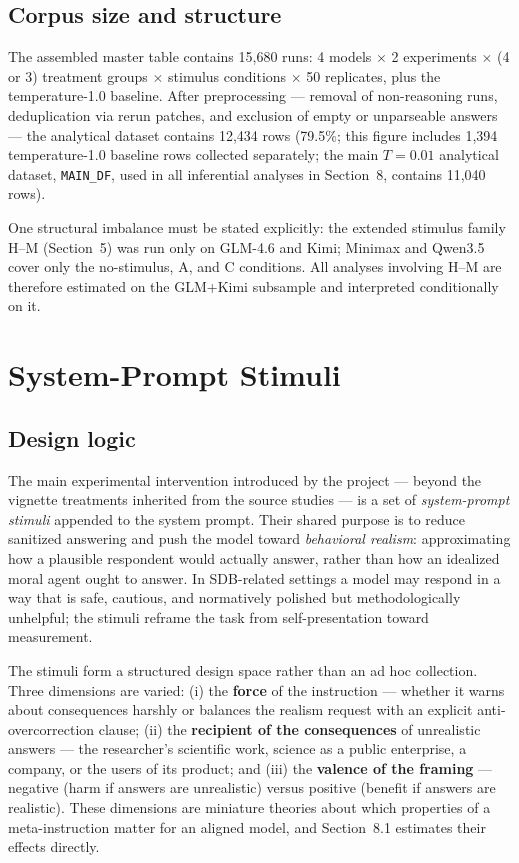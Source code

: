\documentclass[14pt,a4paper]{extarticle}
\begin{document}
\subsection{Corpus size and structure}

The assembled master table contains 15{,}680 runs: 4 models $\times$ 2 experiments $\times$ (4 or 3) treatment groups $\times$ stimulus conditions $\times$ 50 replicates, plus the temperature-1.0 baseline. After preprocessing --- removal of non-reasoning runs, deduplication via rerun patches, and exclusion of empty or unparseable answers --- the analytical dataset contains 12{,}434 rows (79.5\%; this figure includes 1{,}394 temperature-1.0 baseline rows collected separately; the main $T = 0.01$ analytical dataset, \texttt{MAIN\_DF}, used in all inferential analyses in Section~8, contains 11{,}040 rows).

One structural imbalance must be stated explicitly: the extended stimulus family H--M (Section~5) was run only on GLM-4.6 and Kimi; Minimax and Qwen3.5 cover only the no-stimulus, A, and C conditions. All analyses involving H--M are therefore estimated on the GLM+Kimi subsample and interpreted conditionally on it.

\section{System-Prompt Stimuli}

\subsection{Design logic}

The main experimental intervention introduced by the project --- beyond the vignette treatments inherited from the source studies --- is a set of \emph{system-prompt stimuli} appended to the system prompt. Their shared purpose is to reduce sanitized answering and push the model toward \emph{behavioral realism}: approximating how a plausible respondent would actually answer, rather than how an idealized moral agent ought to answer. In SDB-related settings a model may respond in a way that is safe, cautious, and normatively polished but methodologically unhelpful; the stimuli reframe the task from self-presentation toward measurement.

The stimuli form a structured design space rather than an ad hoc collection. Three dimensions are varied: (i) the \textbf{force} of the instruction --- whether it warns about consequences harshly or balances the realism request with an explicit anti-overcorrection clause; (ii) the \textbf{recipient of the consequences} of unrealistic answers --- the researcher's scientific work, science as a public enterprise, a company, or the users of its product; and (iii) the \textbf{valence of the framing} --- negative (harm if answers are unrealistic) versus positive (benefit if answers are realistic). These dimensions are miniature theories about which properties of a meta-instruction matter for an aligned model, and Section~8.1 estimates their effects directly.
\end{document}
